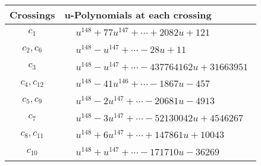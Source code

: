 \documentclass[1p]{elsarticle_modified}
\theoremstyle{definition}
\begin{document}
\begin{tabular}{m{50pt}|m{274pt}}
Crossings & \hspace{64pt}u-Polynomials at each crossing \\
\hline $$\begin{aligned}c_{1}\end{aligned}$$&$\begin{aligned}
&u^{148}+77 u^{147}+\cdots+2082 u+121
\end{aligned}$\\
\hline $$\begin{aligned}c_{2},c_{6}\end{aligned}$$&$\begin{aligned}
&u^{148}- u^{147}+\cdots-28 u+11
\end{aligned}$\\
\hline $$\begin{aligned}c_{3}\end{aligned}$$&$\begin{aligned}
&u^{148}- u^{147}+\cdots-437764162 u+31663951
\end{aligned}$\\
\hline $$\begin{aligned}c_{4},c_{12}\end{aligned}$$&$\begin{aligned}
&u^{148}-41 u^{146}+\cdots-1867 u-457
\end{aligned}$\\
\hline $$\begin{aligned}c_{5},c_{9}\end{aligned}$$&$\begin{aligned}
&u^{148}-2 u^{147}+\cdots-20681 u-4913
\end{aligned}$\\
\hline $$\begin{aligned}c_{7}\end{aligned}$$&$\begin{aligned}
&u^{148}-3 u^{147}+\cdots-52130042 u+4546267
\end{aligned}$\\
\hline $$\begin{aligned}c_{8},c_{11}\end{aligned}$$&$\begin{aligned}
&u^{148}+6 u^{147}+\cdots+147861 u+10043
\end{aligned}$\\
\hline $$\begin{aligned}c_{10}\end{aligned}$$&$\begin{aligned}
&u^{148}+u^{147}+\cdots-171710 u-36269
\end{aligned}$\\
\hline
\end{tabular}\\~\\
\end{document}
